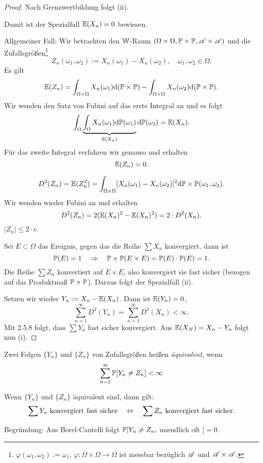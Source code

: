 \begin{proof}
  Nach Grenzwertbildung folgt (ii).

  Damit ist der Spezialfall $\mathbb{E}(X_n) = 0$ bewiesen.

  Allgemeiner Fall: Wir betrachten den $\mathbb{W}$-Raum $(\Omega \times \Omega, \mathbb{P}
  \times \mathbb{P}, \mathscr{A} \times \mathscr{A})$ und die Zufallsgrößen\footnote{%
  $\varphi(\omega_1, \omega_2) := \omega_1$, $\varphi: \Omega \times\Omega \to
  \Omega$ ist messbar bezüglich $\mathscr{A}$ und $\mathscr{A} \times \mathscr{A}$.}
  \[ Z_n( \omega_1, \omega_2) := X_n(\omega_1) - X_n(\omega_2), \quad \omega_1,
    \omega_2 \in \Omega. \]
  Es gilt
  \[ \mathbb{E}(Z_n) =
    \int_{\Omega \times \Omega} X_n(\omega_1) \mathrm{d} (\mathbb{P} \times \mathbb{P}) -
    \int_{\Omega \times \Omega} X_n(\omega_2) \mathrm{d} (\mathbb{P} \times \mathbb{P}). \]
  Wir wenden den Satz von Fubini auf das erste Integral an und es folgt
  \[ \int_\Omega
    \underbrace{\int_\Omega X_n(\omega_1) \mathrm{d} \mathbb{P}(\omega_1)}_{\mathbb{E}(X_n)}
    \mathrm{d} \mathbb{P}(\omega_2) = \mathbb{E}(X_n). \]
  Für das zweite Integral verfahren wir genauso und erhalten
  \[ \mathbb{E}(Z_n) = 0. \]

  \[ D^2(Z_n) = \mathbb{E}(Z_n^2) = \int_{\Omega \times \Omega} [X_n(\omega_1) -
    X_n(\omega_2)]^2 \mathrm{d} \mathbb{P} \times \mathbb{P}(\omega_1, \omega_2). \]
  Wir wenden wieder Fubini an und erhalten
  \[ D^2(Z_n) = 2 (\mathbb{E}(X_n)^2 - \mathbb{E}(X_n)^2)= 2 \cdot D^2(X_n). \]
  $|Z_n| \le 2 \cdot c$.

  Sei $E \subset \Omega$ das Ereignis, gegen das die Reihe $\sum X_n$
  konvergiert, dann ist
  \[ \mathbb{P}(E) = 1 \quad \Rightarrow \quad \mathbb{P} \times \mathbb{P}(E \times E) = \mathbb{P}(E) \cdot \mathbb{P}(E) = 1. \]
  Die Reihe $\sum Z_n$ konvertiert auf $E \times E$, also konvergiert sie fast
  sicher (bezogen auf das Produktmaß $\mathbb{P} \times \mathbb{P}$). Daraus folgt der
  Spezialfall (ii).

  Setzen wir wieder $Y_n := X_n - \mathbb{E}(X_n)$. Dann ist $\mathbb{E}(Y_n) = 0$,
  \[ \sum_{n=1}^\infty D^2(Y_n) = \sum_{n=1}^\infty D^2(X_n) < \infty. \]
  Mit 2.5.8 folgt, dass $\sum Y_n$ fast sicher konvergiert. Aus $\mathbb{E}(X_N) = X_n
  - Y_n$ folgt nun (i).
\end{proof}

\begin{defn}
  Zwei Folgen $\{Y_n\}$ und $\{Z_n\}$ von Zufallsgrößen heißen
  \emph{äquivalent}, wenn
  \[ \sum_{n=1}^\infty \mathbb{P} [Y_n \ne Z_n] < \infty \]

  Wenn $\{Y_n\}$ und $\{Z_n\}$ äquivalent sind, dann gilt:
  \[ \sum Y_n \text{ konvergiert fast sicher} \quad \Leftrightarrow \quad \sum Z_n \text{ konvergiert
      fast sicher}. \]

  Begründung: Aus Borel-Cantelli folgt $\mathbb{P}[Y_n \ne Z_n, $ unendlich oft $] =
  0$.
\end{defn}

